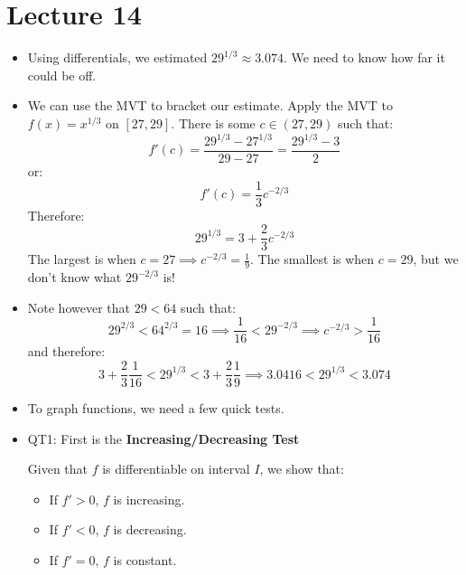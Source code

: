 \section{Lecture 14}
\begin{itemize}
    \item Using differentials, we estimated $29^{1/3} \approx 3.074$. We need to know how far it could be off.
    \item We can use the MVT to bracket our estimate. Apply the MVT to $f(x)=x^{1/3}$ on $[27,29]$. There is some $c \in (27,29)$ such that:
    \begin{equation}
        f'(c)=\frac{29^{1/3}-27^{1/3}}{29-27}=\frac{29^{1/3}-3}{2}
        \label{eq:}
    \end{equation}
    or:
    \begin{equation}
        f'(c)=\frac{1}{3}c^{-2/3}
        \label{eq:}
    \end{equation}
    Therefore:
    \begin{equation}
        29^{1/3}=3+\frac{2}{3}c^{-2/3}
        \label{eq:}
    \end{equation}
    The largest is when $c=27 \implies c^{-2/3}=\frac{1}{9}$. The smallest is when $c=29$, but we don't know what $29^{-2/3}$ is!
    \item Note however that $29<64$ such that:
    \begin{equation}
        29^{2/3} < 64^{2/3} = 16 \implies \frac{1}{16} < 29^{-2/3} \implies c^{-2/3} > \frac{1}{16}
        \label{eq:}
    \end{equation}
    and therefore:
    \begin{equation}
        3+\frac{2}{3}\frac{1}{16} < 29^{1/3} < 3+\frac{2}{3}\frac{1}{9} \implies 3.0416 < 29^{1/3} < 3.074
        \label{eq:}
    \end{equation}
    \item To graph functions, we need a few quick tests.
    \item QT1: First is the \textbf{Increasing/Decreasing Test}
    \begin{idea}
        Given that $f$ is differentiable on interval $I$, we show that:
    \begin{itemize}
        \item If $f'>0$, $f$ is increasing.
        \item If $f'<0$, $f$ is decreasing.
        \item If $f'=0$, $f$ is constant.
    \end{itemize}
    \end{idea}

\end{itemize}
